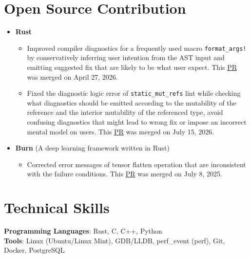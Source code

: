 \documentclass[letterpaper,11pt]{article}
\newcommand{\resumeSubHeadingListEnd}{\end{itemize}}
\begin{document}

\section{Open Source Contribution}
\label{sec:osc}
\begin{itemize}[leftmargin=0.15in, label={}]
	\item \textbf{Rust}
	      \begin{itemize}[leftmargin=0.15in]
		      \item
		            Improved compiler diagnostics for a frequently used macro \texttt{format\_args!} by conservatively inferring
		            user intention from the AST input and emitting suggested fix that are likely to be what user expect.
		            This \href{https://github.com/rust-lang/rust/pull/155693}{\underline{PR}} was merged on April 27, 2026.
		      \item
		            Fixed the diagnostic logic error of \texttt{static\_mut\_refs} lint while checking what diagnostics should
		            be emitted according to the mutability of the reference and the interior mutability of the
		            referenced type, avoid confusing diagnostics that might lead to wrong fix or impose an incorrect mental model on users.
		            This \href{https://github.com/rust-lang/rust/pull/159168}{\underline{PR}} was merged on July 15, 2026.
	      \end{itemize}
	\item \textbf{Burn} (A deep learning framework written in Rust)
	      \begin{itemize}[leftmargin=0.15in]
		      \item
		            Corrected error messages of tensor flatten operation that are inconsistent with the failure conditions.
		            This \href{https://github.com/tracel-ai/burn/pull/3319}{\underline{PR}} was merged
		            on July 8, 2025.
	      \end{itemize}
\end{itemize}

\section{Technical Skills}
\begin{itemize}[leftmargin=0.15in, label={}]
	\small{\item{
	      \textbf{Programming Languages}{: Rust, C, C++, Python} \\
	      \textbf{Tools}{: Linux (Ubuntu/Linux Mint), GDB/LLDB, perf\_event (perf), Git, Docker, PostgreSQL} \\
	      }}
\end{itemize}
\end{document}
